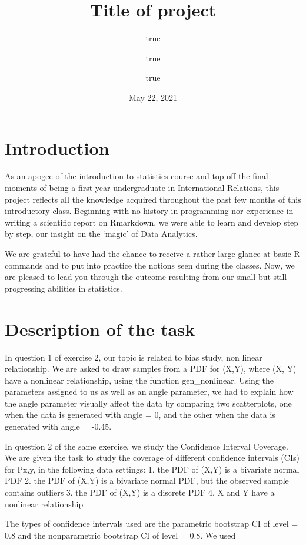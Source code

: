 \documentclass[11pt,]{article}
\title{Title of project}
\author{true \and true \and true}
\date{May 22, 2021}
\begin{document}
\maketitle

\hypertarget{introduction}{%
\section{Introduction}\label{introduction}}

As an apogee of the introduction to statistics course and top off the
final moments of being a first year undergraduate in International
Relations, this project reflects all the knowledge acquired throughout
the past few months of this introductory class. Beginning with no
history in programming nor experience in writing a scientific report on
Rmarkdown, we were able to learn and develop step by step, our insight
on the `magic' of Data Analytics.

We are grateful to have had the chance to receive a rather large glance
at basic R commands and to put into practice the notions seen during the
classes. Now, we are pleased to lead you through the outcome resulting
from our small but still progressing abilities in statistics.

\hypertarget{description-of-the-task}{%
\section{Description of the task}\label{description-of-the-task}}

In question 1 of exercise 2, our topic is related to bias study, non
linear relationship. We are asked to draw samples from a PDF for (X,Y),
where (X, Y) have a nonlinear relationship, using the function
gen\_nonlinear. Using the parameters assigned to us as well as an angle
parameter, we had to explain how the angle parameter visually affect the
data by comparing two scatterplots, one when the data is generated with
angle = 0, and the other when the data is generated with angle = -0.45.

In question 2 of the same exercise, we study the Confidence Interval
Coverage. We are given the task to study the coverage of different
confidence intervals (CIs) for Px,y, in the following data settings: 1.
the PDF of (X,Y) is a bivariate normal PDF 2. the PDF of (X,Y) is a
bivariate normal PDF, but the observed sample contains outliers 3. the
PDF of (X,Y) is a discrete PDF 4. X and Y have a nonlinear relationship

The types of confidence intervals used are the parametric bootstrap CI
of level = 0.8 and the nonparametric bootstrap CI of level = 0.8. We
used
\end{document}
